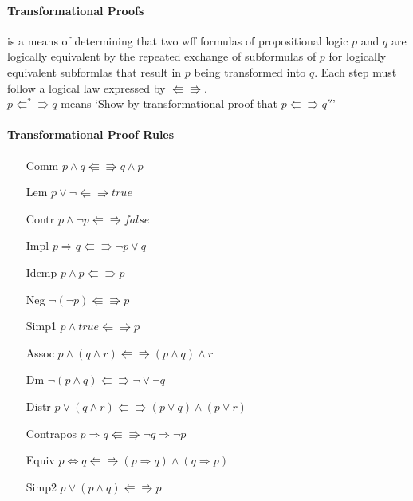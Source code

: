       \paragraph{Transformational Proofs} is a means of determining that two
      wff formulas of propositional logic $p$ and $q$ are logically equivalent
      by the repeated exchange of subformulas of $p$ for logically equivalent
      subformlas that result in $p$ being transformed into $q$. Each step must
      follow a logical law expressed by $\Lleftarrow\Rrightarrow$.\\
      $p\Lleftarrow^?\Rrightarrow q$ means `Show by transformational proof that
      $p\Lleftarrow\Rrightarrow q''$'
      \paragraph{Transformational Proof Rules}
      \begin{itemize}
        \item[Comm] $p\land q \Lleftarrow\Rrightarrow q\land p$
        \item[Lem] $p\lor\lnot \Lleftarrow\Rrightarrow true$
        \item[Contr] $p\land\lnot p\Lleftarrow\Rrightarrow false$
        \item[Impl] $p \Rightarrow q\Lleftarrow\Rrightarrow \lnot p \lor q$
        \item[Idemp] $p \land p\Lleftarrow\Rrightarrow p$
        \item[Neg] $\lnot(\lnot p)\Lleftarrow\Rrightarrow p$
        \item[Simp1] $p\land true\Lleftarrow\Rrightarrow p$
        \item[Assoc] $p \land (q \land r)\Lleftarrow\Rrightarrow (p \land q)
          \land r$
        \item[Dm] $\lnot(p\land q)\Lleftarrow\Rrightarrow \lnot \lor \lnot q$
        \item[Distr] $p \lor (q \land r)\Lleftarrow\Rrightarrow (p \lor q)
          \land (p \lor r)$
        \item[Contrapos] $p \Rightarrow q\Lleftarrow\Rrightarrow \lnot q
          \Rightarrow \lnot p$
        \item[Equiv] $p \Leftrightarrow q\Lleftarrow\Rrightarrow (p\Rightarrow
          q) \land (q \Rightarrow p)$
        \item[Simp2] $p \lor (p \land q)\Lleftarrow\Rrightarrow p$
      \end{itemize}

